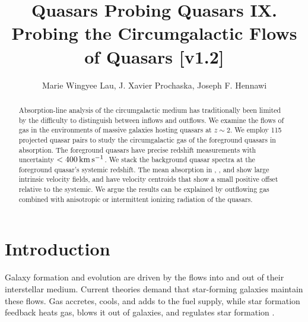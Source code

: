 \documentclass[iop]{emulateapj}
\begin{document}
\title{Quasars Probing Quasars IX. Probing the Circumgalactic Flows of Quasars [v1.2]}

\author{Marie Wingyee Lau, J. Xavier Prochaska, 
Joseph F. Hennawi
}

\begin{abstract}
Absorption-line analysis of the circumgalactic medium has traditionally been limited by the 
difficulty to distinguish between inflows and outflows. We examine the flows of gas in the 
environments of massive galaxies hosting quasars at $z\sim2$. We employ 115 projected quasar pairs 
to study the circumgalactic gas of the foreground quasars in absorption. The foreground quasars 
have precise redshift measurements with uncertainty $<400\,{\rm km\,s^{-1}}$. We stack the 
background quasar spectra at the foreground quasar's systemic redshift. The mean absorption in 
, , and  show large intrinsic velocity fields, and have velocity 
centroids that show a small positive offset relative to the systemic. We argue the results can be 
explained by outflowing gas combined with anisotropic or intermittent ionizing radiation of the 
quasars. 
\end{abstract}



\section{Introduction}
\label{sec:introduction}

Galaxy formation and evolution are driven by the flows into and out of their interstellar medium. 
Current theories demand that star-forming galaxies maintain these flows. Gas accretes, cools, and 
adds to the fuel supply, while star formation feedback heats gas, blows it out of galaxies, and 
regulates star formation \citep[for a review see][]{SomervilleDave15}. 
\end{document}
